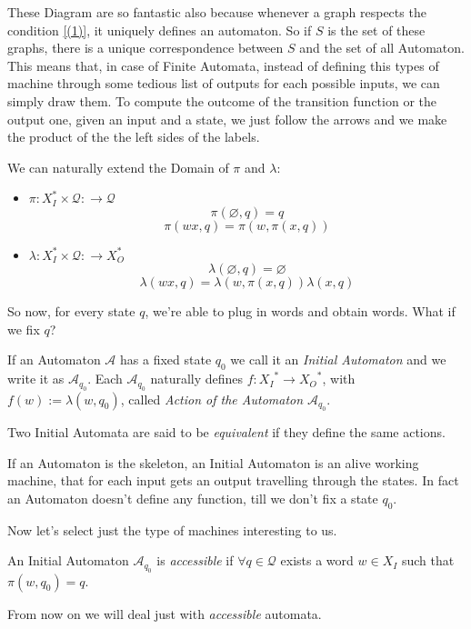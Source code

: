 \documentclass[mat1]{fmfdeloTS}
\newcommand{\auto}{\mathcal{A}}
\newcommand{\QQ}{\mathcal{Q}}
\begin{document}
These Diagram are so fantastic also because whenever a graph respects the condition \ref{(1)}, it uniquely defines an automaton. So if $S$ is the set of these graphs, there is a unique correspondence between $S$ and the set of all Automaton. This means that, in case of Finite Automata, instead of defining this types of machine through some tedious list of outputs for each possible inputs, we can simply draw them. To compute the outcome of the transition function or the output one, given an input and a state, we just follow the arrows and we make the product of the the left sides of the labels.

\begin{proposition}
We can naturally extend the Domain of $\pi$ and $\lambda$:
\begin{itemize}
	\item $\pi:X_{I}^{*} \times \QQ:\longrightarrow \QQ $
	$$\pi(\varnothing,q)=q$$ $$\pi(w x,q)=\pi(w,\pi(x,q))$$
	\item $\lambda:X_{I}^{*} \times \QQ:\longrightarrow X_{O}^{*}$
	$$\lambda(\varnothing,q)=\varnothing$$ $$\lambda(w x,q)=\lambda(w,\pi(x,q))\lambda(x,q)$$
\end{itemize}
\end{proposition}
So now, for every state $q$, we're able to plug in words and obtain words. What if we fix $q$?

\begin{definition}
If an  Automaton $\auto$ has a fixed state $q_0$ we call it an \textit{Initial  Automaton} and we write it as $\auto_{q_0}$. Each $\auto_{q_0}$ naturally defines $f:{X_I}^*\longrightarrow {X_O}^*$, with $f(w):=\lambda(w,q_0)$, called \emph{Action of the  Automaton $\auto_{q_0}$}.
\end{definition}

\begin{definition}
Two Initial Automata are said to be \textit{equivalent} if they define the same actions.
\end{definition}


If an Automaton is the skeleton, an Initial Automaton is an alive working machine, that for each input gets an output travelling through the states. In fact an Automaton doesn't define any function, till we don't fix a state $q_0$.

Now let's select just the type of machines interesting to us.
\begin{definition}
An Initial Automaton $\auto_{q_0}$ is \textit{accessible} if $\forall q\in\QQ$ exists a word $w\in X_I$ such that $\pi(w,q_0)=q$.
\end{definition}
From now on we will deal just with \textit{accessible} automata.
\end{document}
